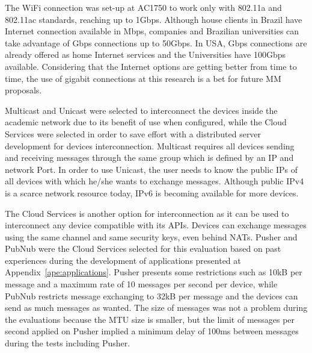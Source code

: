 The WiFi connection was set-up at AC1750 to work only with 802.11a and 802.11ac standards, reaching up to 1Gbps.
Although house clients in Brazil have Internet connection available in Mbps, companies and Brazilian universities can take advantage of Gbps connections up to 50Gbps.
In USA, Gbps connections are already offered as home Internet services and the Universities have 100Gbps available.
Considering that the Internet options are getting better from time to time, the use of gigabit connections at this research is a bet for future MM proposals.

Multicast and Unicast were selected to interconnect the devices inside the academic network due to its benefit of use when configured, while the Cloud Services were selected in order to save effort with a distributed server development for devices interconnection.
Multicast requires all devices sending and receiving messages through the same group which is defined by an IP and network Port.
In order to use Unicast, the user needs to know the public IPs of all devices with which he/she wants to exchange messages.
Although public IPv4 is a scarce network resource today, IPv6 is becoming available for more devices.

The Cloud Services is another option for interconnection as it can be used to interconnect any device compatible with its APIs.
Devices can exchange messages using the same channel and same security keys, even behind NATs.
Pusher and PubNub were the Cloud Services selected for this evaluation based on past experiences during the development of applications presented at Appendix~\ref{ape:applications}.
Pusher presents some restrictions such as 10kB per message and a maximum rate of 10 messages per second per device, while PubNub restricts message exchanging to 32kB per message and the devices can send as much messages as wanted.
The size of messages was not a problem during the evaluations because the MTU size is smaller, but the limit of messages per second applied on Pusher implied a minimum delay of 100ms between messages during the tests including Pusher.

